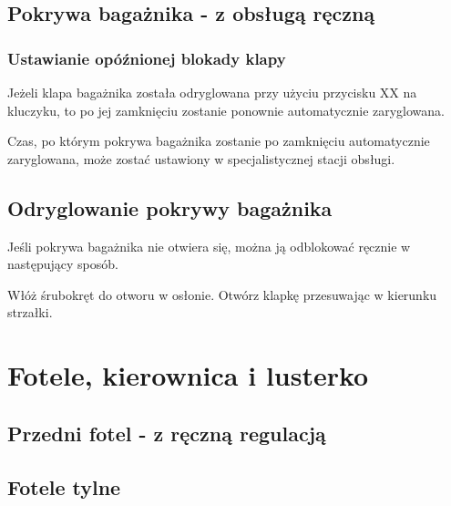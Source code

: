 \subsection{Pokrywa bagażnika - z obsługą ręczną}



\subsubsection{Ustawianie opóźnionej blokady klapy}

Jeżeli klapa bagażnika została odryglowana przy użyciu przycisku XX na kluczyku, to po jej zamknięciu zostanie ponownie automatycznie zaryglowana.

Czas, po którym pokrywa bagażnika zostanie po zamknięciu automatycznie zaryglowana, może zostać ustawiony w specjalistycznej stacji obsługi.


\subsection{Odryglowanie pokrywy bagażnika}

Jeśli pokrywa bagażnika nie otwiera się, można ją odblokować ręcznie w następujący sposób.


\begin{itemizeArrow}
	\itemArrow Włóż śrubokręt do otworu w osłonie.
	\itemArrow Otwórz klapkę przesuwając w kierunku strzałki.
\end{itemizeArrow}


\section{Fotele, kierownica i lusterko}

\subsection{Przedni fotel - z ręczną regulacją}


\subsection{Fotele tylne}

